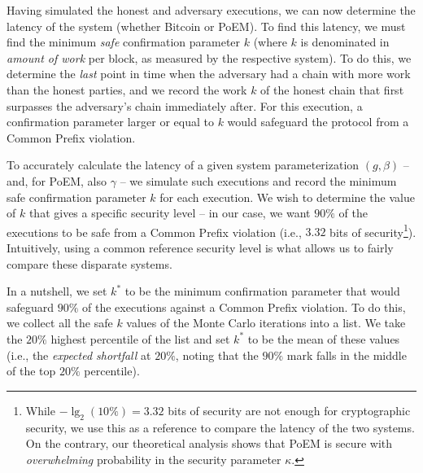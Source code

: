Having simulated the honest and adversary executions, we can now determine the latency of the system (whether Bitcoin or PoEM).
To find this latency, we must find the minimum \emph{safe} confirmation parameter $k$ (where $k$ is denominated in \emph{amount of work} per block, as measured
by the respective system).
To do this, we determine the \emph{last} point in time when the adversary had a chain with more work than the honest parties,
and we record the work $k$ of the honest chain that first surpasses the adversary's chain immediately after.
For this execution, a confirmation parameter larger or equal to $k$ would safeguard the protocol from a Common Prefix violation.

To accurately calculate the latency of a given system parameterization $(g, \beta)$ -- and, for PoEM, also $\gamma$ -- we
simulate \montecarlo{} such executions and record the minimum safe confirmation
parameter $k$ for each execution. We wish to determine the value of $k$ that gives a specific
security level -- in our case, we want $90\%$ of the executions to be safe from a Common Prefix violation (i.e., $3.32$ bits of
security\footnote{While $-\lg_2(10\%) = 3.32$ bits of security are not enough for cryptographic security, we use this as a
reference to compare the latency of the two systems. On the contrary, our theoretical analysis shows that PoEM is secure with \emph{overwhelming} probability
in the security parameter $\kappa$.}).
Intuitively, using a common reference security level is what allows us to fairly compare these disparate systems.

In a nutshell, we set $k^*$ to be the minimum confirmation parameter that would safeguard $90\%$ of the executions against a Common Prefix violation.
To do this, we collect all the safe $k$ values of the \montecarlo{} Monte Carlo iterations into a list.
We take the $20\%$ highest percentile of the list and set $k^*$ to be the mean of these values (i.e., the \emph{expected shortfall}
at $20\%$, noting that the $90\%$ mark falls in the middle of the top $20\%$ percentile).

